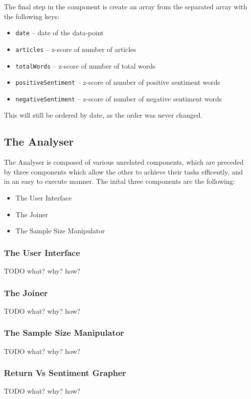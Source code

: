 The final step in the component is create an array from the separated array with the following keys:
\begin{itemize}
    \item \texttt{date} -- date of the data-point
    \item \texttt{articles} -- z-score of number of articles
    \item \texttt{totalWords} -- z-score of number of total words
    \item \texttt{positiveSentiment} -- z-score of number of positive sentiment words
    \item \texttt{negativeSentiment} -- z-score of number of negative sentiment words
\end{itemize}
This will still be ordered by date, as the order was never changed.

\subsection{The Analyser}

The Analyser is composed of various unrelated components, which are preceded by three components which allow the other to achieve their tasks efficently, and in an easy to execute manner. The inital three components are the following: 
\begin{itemize}
    \item The User Interface
    \item The Joiner
    \item The Sample Size Manipulator
\end{itemize}

\subsubsection{The User Interface}
TODO what? why? how?

\subsubsection{The Joiner}
TODO what? why? how?

\subsubsection{The Sample Size Manipulator}
TODO what? why? how?

\subsubsection{Return Vs Sentiment Grapher}
TODO what? why? how?

